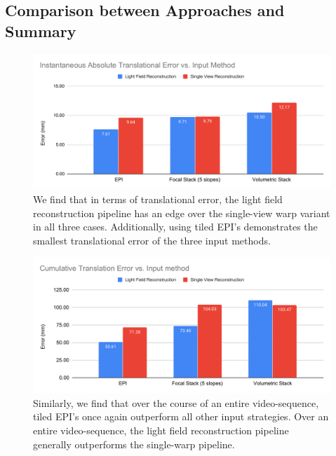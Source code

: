\subsection{Comparison between Approaches and Summary}

\begin{figure}[H]
    \includegraphics[width=\textwidth]{images/result-examples/bargraphs/iate-vs-inputmethod.pdf}
    \caption[Instantaneous translational errors vs. input methods.]{We find that in terms of translational error, the light field reconstruction pipeline has an edge over the single-view warp variant in all three cases. Additionally, using tiled EPI's demonstrates the smallest translational error of the three input methods.}
\end{figure}
\begin{figure}[H]
    \includegraphics[width=\textwidth]{images/result-examples/bargraphs/cte-vs-inputmethod.pdf}
    \caption[Cumulative translational errors vs. input methods.]{Similarly, we find that over the course of an entire video-sequence, tiled EPI's once again outperform all other input strategies. Over an entire video-sequence, the light field reconstruction pipeline generally outperforms the single-warp pipeline.}
\end{figure}
